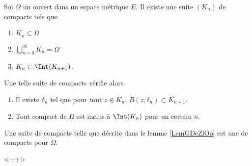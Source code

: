 \begin{lemma}       \label{LemGDeZlOo}
    Soi \( \Omega\) un ouvert dans un espace métrique \( E\). Il existe une suite \( (K_n)\) de compacts tels que
    \begin{enumerate}
        \item
            \( K_n\subset \Omega\)
        \item
            \( \bigcup_{n=0}^{\infty}K_n=\Omega\)
        \item
            \( K_n\subset\Int(K_{n+1})\).
    \end{enumerate}
    Une telle suite de compacts vérifie alors
    \begin{enumerate}
        \item
            Il existe \( \delta_n\) tel que pour tout \( z\in K_n\), \( B(z,\delta_n)\subset K_{n+1}\).
        \item
            Tout compact de \( \Omega\) est inclus à \( \Int(K_n)\) pour un certain \( n\).            
    \end{enumerate}
\end{lemma}

\begin{definition}      \label{DefTBJXooONOgxb}
    Une suite de compacts telle que décrite dans le lemme \ref{LemGDeZlOo} est une  de compacts pour \( \Omega\).
\end{definition}
<++>

